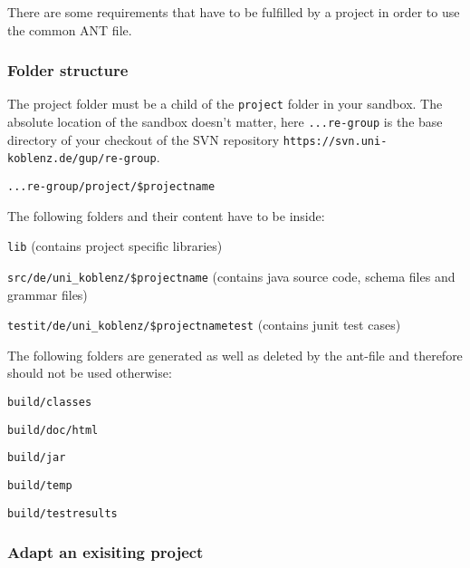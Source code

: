 \documentclass
[
		a4paper,
		twoside, 										
		BCOR10mm,											
		11pt,												
		halfparskip,								
		bigheadings,								
		notitlepage,			
		pdftex											
]
{scrartcl}
\begin{document}
There are some requirements that have to be fulfilled by a project in order to use the common ANT file.


\subsubsection{Folder structure}
\label{FolderStructure}

The project folder must be a child of the \texttt{project} folder in your sandbox. The absolute location of the sandbox doesn't matter, here \texttt{...re-group} is the base directory of your checkout of the SVN repository \texttt{https://svn.uni-koblenz.de/gup/re-group}.

\footnotesize
\begin{compactitem}
	\item \texttt{...re-group/project/\$projectname}
\end{compactitem}
\normalsize

The following folders and their content have to be inside:
\footnotesize
\begin{compactitem}
	\item \texttt{lib} (contains project specific libraries)
	\item \texttt{src/de/uni\_koblenz/\$projectname} (contains java source code, schema files and grammar files)
	\item \texttt{testit/de/uni\_koblenz/\$projectnametest} (contains junit test cases)
\end{compactitem}
\normalsize

The following folders are generated as well as deleted by the ant-file and therefore should not be used otherwise:
\footnotesize
\begin{compactitem}
	\item \texttt{build/classes}
	\item \texttt{build/doc/html}
	\item \texttt{build/jar}
	\item \texttt{build/temp}
	\item \texttt{build/testresults}
\end{compactitem}
\normalsize


\subsubsection{Adapt an exisiting project}
\label{LocalANTFile}
\end{document}
